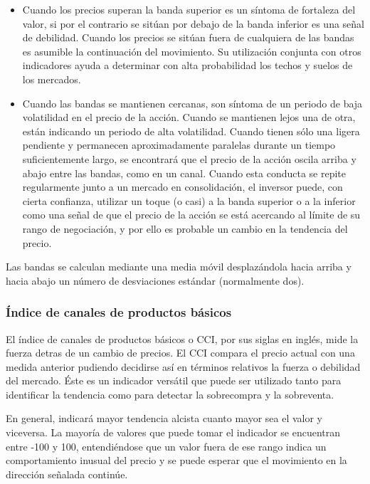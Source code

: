 \begin{itemize}
\item Cuando los precios superan la banda superior es un síntoma de fortaleza del valor, si por el contrario se sitúan por debajo de la banda inferior es una señal de debilidad. Cuando los precios se sitúan fuera de cualquiera de las bandas es asumible la continuación del movimiento. Su utilización conjunta con otros indicadores ayuda a determinar con alta probabilidad los techos y suelos de los mercados.

\item Cuando las bandas se mantienen cercanas, son síntoma de un periodo de baja volatilidad en el precio de la acción. Cuando se mantienen lejos una de otra, están indicando un periodo de alta volatilidad. Cuando tienen sólo una ligera pendiente y permanecen aproximadamente paralelas durante un tiempo suficientemente largo, se encontrará que el precio de la acción oscila arriba y abajo entre las bandas, como en un canal. Cuando esta conducta se repite regularmente junto a un mercado en consolidación, el inversor puede, con cierta confianza, utilizar un toque (o casi) a la banda superior o a la inferior como una señal de que el precio de la acción se está acercando al límite de su rango de negociación, y por ello es probable un cambio en la tendencia del precio. 

\end{itemize}


Las bandas se calculan mediante una media móvil desplazándola hacia arriba y hacia abajo un número de desviaciones estándar (normalmente dos).


\pagebreak

\subsubsection*{Índice de canales de productos básicos}
El índice de canales de productos básicos o CCI, por sus siglas en inglés, mide la fuerza detras de un cambio de precios. El CCI compara el precio actual con una medida anterior pudiendo decidirse así en términos relativos la fuerza o debilidad del mercado. Éste es un indicador versátil que puede ser utilizado tanto para identificar la tendencia como para detectar la sobrecompra y la sobreventa.

En general, indicará mayor tendencia alcista cuanto mayor sea el valor y viceversa. La mayoría de valores que puede tomar el indicador se encuentran entre -100 y 100, entendiéndose que un valor fuera de ese rango indica un comportamiento inusual del precio y se puede esperar que el movimiento en la dirección señalada continúe.


